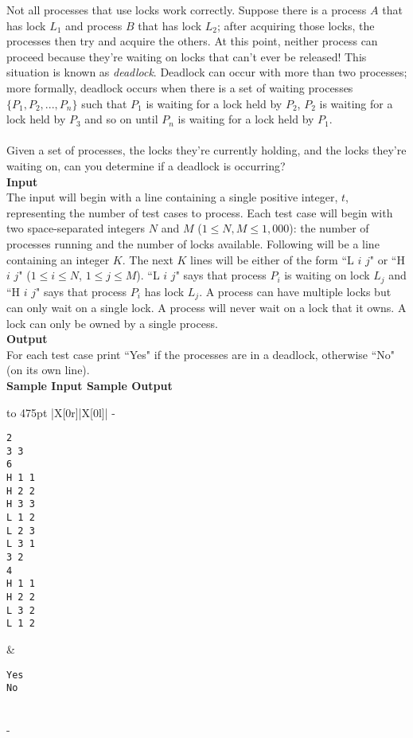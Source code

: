 \documentclass[a4paper,11pt]{article}
\begin{document}
{Not all processes that use locks work correctly. Suppose there is a process $A$ that has lock $L_1$ and process $B$ that has lock $L_2$; after acquiring those locks, the processes then try and acquire the others. At this point, neither process can proceed because they're waiting on locks that can't ever be released! This situation is known as \emph{deadlock}. Deadlock can occur with more than two processes; more formally, deadlock occurs when there is a set of waiting processes $\{P_1, P_2, ..., P_n\}$ such that $P_1$ is waiting for a lock held by $P_2$, $P_2$ is waiting for a lock held by $P_3$ and so on until $P_n$ is waiting for a lock held by $P_1$.\\\\
Given a set of processes, the locks they're currently holding, and the locks they're waiting on, can you determine if a deadlock is occurring?
}
\vspace{7mm}\\
\large{\bf{Input}}\vspace{2mm}\\
The input will begin with a line containing a single positive integer, $t$, representing the number of test cases to process. Each test case will begin with two space-separated integers $N$ and $M$ ($1 \leq N, M \leq 1,000$): the number of processes running and the number of locks available. Following will be a line containing an integer $K$. The next $K$ lines will be either of the form ``L $i$ $j$" or ``H $i$ $j$" ($1 \leq i \leq N$, $1 \leq j \leq M$). ``L $i$ $j$" says that process $P_i$ is waiting on lock $L_j$ and ``H $i$ $j$" says that process $P_i$ has lock $L_j$. A process can have multiple locks but can only wait on a single lock. A process will never wait on a lock that it owns. A lock can only be owned by a single process.
\vspace{20mm}\\
\large{\bf{Output}}\vspace{2mm}\\
For each test case print ``Yes" if the processes are in a deadlock, otherwise ``No" (on its own line).
\vspace{5mm}\\
\bf{Sample Input} \hspace{52mm} \bf{Sample Output}\vspace{1mm}\\
\begin{tabu*} to 475pt {|X[0r]|X[0l]|}
\tabucline-
\vspace{-\baselineskip} %
\begin{Verbatim}
2
3 3
6
H 1 1
H 2 2
H 3 3
L 1 2
L 2 3
L 3 1
3 2
4
H 1 1
H 2 2
L 3 2
L 1 2
\end{Verbatim}
&
\vspace{-\baselineskip} %
\begin{Verbatim}
Yes
No
\end{Verbatim}
\\
\tabucline-
\end{tabu*}
\end{document}

